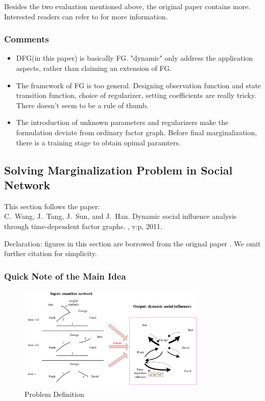 \documentclass[11pt,a4paper]{article}
\begin{document}
Besides the two evaluation mentioned above, the original paper
contains more. Interested readers can refer to \cite{mirowski2009dynamic} for 
more information. 

\subsubsection{Comments}

\begin{itemize}
	\item DFG(in this paper) is basically FG. 
	"dynamic" only address the application aspects, rather 
	than claiming an extension of FG. 
	\item The framework of FG is too general. 
	Designing observation function and state transition function, 
	choice of regularizer, setting coefficients are really tricky.
	There doesn't seem to be a rule of thumb. 
	\item The introduction of unknown parameters and regularizers
	make the formulation deviate from ordinary factor graph. 
	Before final marginalization, there is a training stage 
	to obtain opimal paramters. 
\end{itemize}

\subsection{Solving Marginalization Problem in Social Network}
This section follows the paper:\\
C.~Wang, J.~Tang, J.~Sun, and J.~Han.
\newblock Dynamic social influence analysis through time-dependent factor
  graphs.
, v:p, 2011.

Declaration: figures in this section are borrowed from the orignal paper
\cite{wang2011-dynamic}. 
We omit further citation for simplicity. 

\subsubsection{Quick Note of the Main Idea}

\begin{figure}[htb]
\centering
	\includegraphics[width=0.8\textwidth]{fig/wang2011-problem.png}
	\caption{Problem Definition}
\end{figure}
\end{document}
